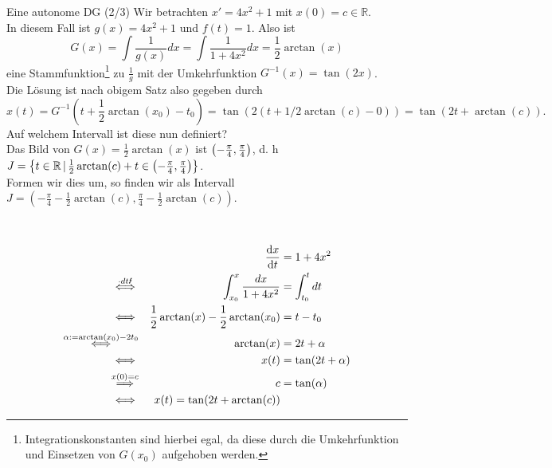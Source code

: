 \begin{Beispiel}
{Eine autonome DG (2/3)}
Wir betrachten $\boxed{x'=4x^2+1}$ mit $x(0)=c\in\mathbb{R}$.\\
In diesem Fall ist $g(x)=4x^2+1$ und $f(t)=1$. Also ist
\begin{equation*}
    G(x)=\int \frac{1}{g(x)}dx=\int \frac{1}{1+4x^2}dx=\frac{1}{2}\arctan(x)
\end{equation*}
eine Stammfunktion\footnote{Integrationskonstanten sind hierbei egal, da diese durch die Umkehrfunktion und Einsetzen von $G(x_0)$ aufgehoben werden.} zu $\frac{1}{g}$ mit der Umkehrfunktion $G^{-1}(x)=\tan(2x)$.\\
Die Lösung ist nach obigem Satz also gegeben durch
\begin{equation*}
    x(t)=G^{-1}(t+\frac{1}{2}\arctan(x_0)-t_0)=\tan(2(t+1/2\arctan(c)-0))=\tan(2t+\arctan(c)).
\end{equation*}
Auf welchem Intervall ist diese nun definiert?\\
Das Bild von $G(x)=\frac{1}{2}\arctan(x)$ ist $\left({-\frac{\pi}{4},\frac{\pi}{4}}\right)$, d. h\\
$J=\left\{t\in\mathbb{R}\,|\,\frac{1}{2}\arctan(c)+t\in\left({-\frac{\pi}{4},\frac{\pi}{4}}\right)\right\}$.\\
Formen wir dies um, so finden wir als Intervall $J=(-\frac{\pi}{4}-\frac{1}{2}\arctan(c),\frac{\pi}{4}-\frac{1}{2}\arctan(c))$.\\
\\
\\
\begin{alignat*}{3}
    &&\diff{x}{t}&=1+4x^2\\
    \overset{\cdot dt\tx{\Lightning}}{\iff}&&\int_{x_0}^x\frac{dx}{1+4x^2}&=\int_{t_0}^tdt\\
    \iff&&\frac{1}{2}\arctan(x)-\frac{1}{2}\arctan(x_0)&=t-t_0\\
    \overset{\alpha:=\arctan(x_0)-2t_0}{\iff}&&\arctan(x)&=2t+\alpha\\
    \iff&&x(t)&=\tan(2t+\alpha)\\
    \overset{x(0)=c}{\implies}&&c&=\tan(\alpha)\\
    \iff &&x(t)=\tan(2t+\arctan(c))
\end{alignat*}
\end{Beispiel}
